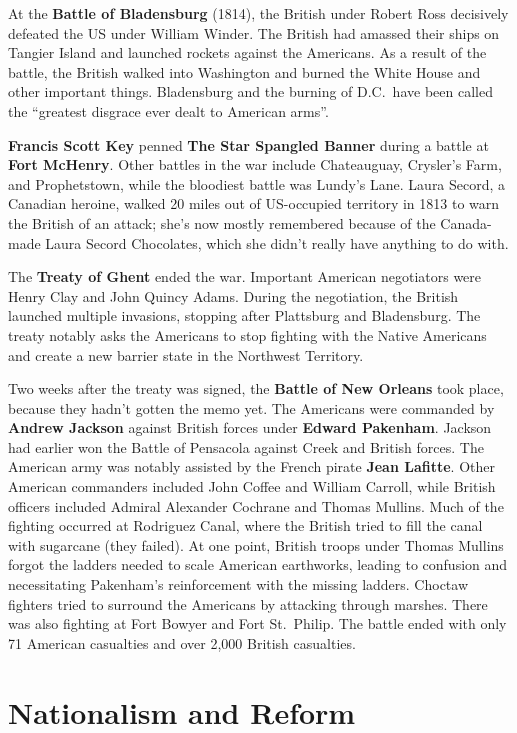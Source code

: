At the \textbf{Battle of Bladensburg} (1814),
the British under Robert Ross decisively defeated the US under William Winder.
The British had amassed their ships on Tangier Island and launched rockets against the Americans.
As a result of the battle,
the British walked into Washington and burned the White House and other important things.
Bladensburg and the burning of D.C.\ have been called
the ``greatest disgrace ever dealt to American arms''.

\textbf{Francis Scott Key} penned \textbf{The Star Spangled Banner}
during a battle at \textbf{Fort McHenry}.
Other battles in the war include Chateauguay, Crysler's Farm, and Prophetstown,
while the bloodiest battle was Lundy's Lane.
Laura Secord, a Canadian heroine,
walked 20 miles out of US-occupied territory in 1813 to warn the British of an attack;
she's now mostly remembered because of the Canada-made Laura Secord Chocolates,
which she didn't really have anything to do with.

The \textbf{Treaty of Ghent} ended the war.
Important American negotiators were Henry Clay and John Quincy Adams.
During the negotiation, the British launched multiple invasions,
stopping after Plattsburg and Bladensburg.
The treaty notably asks the Americans to stop fighting with the Native Americans
and create a new barrier state in the Northwest Territory.

Two weeks after the treaty was signed, the \textbf{Battle of New Orleans} took place,
because they hadn't gotten the memo yet.
The Americans were commanded by \textbf{Andrew Jackson}
against British forces under \textbf{Edward Pakenham}.
Jackson had earlier won the Battle of Pensacola against Creek and British forces.
The American army was notably assisted by the French pirate \textbf{Jean Lafitte}.
Other American commanders included John Coffee and William Carroll,
while British officers included Admiral Alexander Cochrane and Thomas Mullins.
Much of the fighting occurred at Rodriguez Canal,
where the British tried to fill the canal with sugarcane (they failed).
At one point,
British troops under Thomas Mullins forgot the ladders needed to scale American earthworks,
leading to confusion and necessitating Pakenham's reinforcement with the missing ladders.
Choctaw fighters tried to surround the Americans by attacking through marshes.
There was also fighting at Fort Bowyer and Fort St.\ Philip.
The battle ended with only 71 American casualties and over 2,000 British casualties.

\section{Nationalism and Reform}


